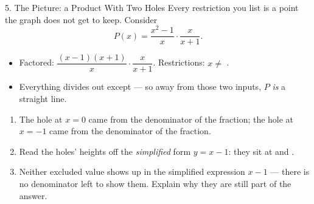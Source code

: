 \documentclass[10pt]{article}
\newcommand{\lgrid}[4]{%
  \draw[step=1, linegray!40, very thin] (#1,#3) grid (#2,#4);
  \draw[->, semithick, charcoal] (#1,0)--(#2,0) node[below right, font=\scriptsize]{$x$};
  \draw[->, semithick, charcoal] (0,#3)--(0,#4) node[left, font=\scriptsize]{$y$};}
\begin{document}
\begin{notesbox}{5. The Picture: a Product With Two Holes}
Every restriction you list is a point the graph does not get to keep. Consider
\[
  P(x)=\frac{x^2-1}{x}\cdot\frac{x}{x+1} .
\]
\begin{itemize}[leftmargin=1.5em, itemsep=3pt]
  \item Factored: $\dfrac{(x-1)(x+1)}{x}\cdot\dfrac{x}{x+1}$. \; Restrictions: $x\neq$ .
  \item Everything divides out except  --- so away from those two inputs, $P$ \emph{is}
        a straight line.
\end{itemize}
\begin{center}
\end{center}
\begin{enumerate}[leftmargin=1.7em, itemsep=3pt]
  \item The hole at $x=0$ came from the denominator of the  fraction; the hole at
        $x=-1$ came from the denominator of the  fraction.
  \item Read the holes' heights off the \emph{simplified} form $y=x-1$: they sit at 
        and .
  \item Neither excluded value shows up in the simplified expression $x-1$ --- there is no denominator
        left to show them. Explain why they are still part of the answer. 
\end{enumerate}
\end{notesbox}
\end{document}
